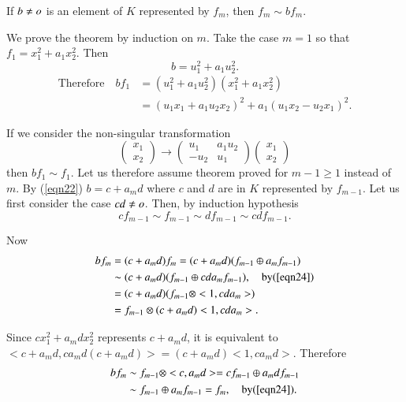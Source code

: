 \begin{thm}\label{thm6}
If $b\neq o$ is an element of $K$ represented by $f_m$, then
$f_m\sim bf_m$.
\end{thm}

\begin{Proof}
We prove the theorem by induction on $m$. Take the case $m=1$ so that
$f_1=x^{2}_1+a_1x^{2}_2$. Then
$$
b=u^{2}_1+a_1u^{2}_2.
$$
\begin{align*}
\text{Therefore}\quad bf_1&=
\left(u^{2}_1+a_1u^{2}_2\right)\left(x^{2}_1+a_1x^{2}_2\right)\\
&=(u_1x_1+a_1u_2x_2)^{2}+a_1(u_1x_2-u_2x_1)^{2}.
\end{align*}

If we consider the non-singular transformation
$$
\begin{pmatrix}
x_1\\
x_2
\end{pmatrix}\longrightarrow \begin{pmatrix}
u_1 & a_1u_2\\
-u_2 & u_1
\end{pmatrix}\begin{pmatrix}
x_1\\
x_2
\end{pmatrix}
$$
then $bf_1\sim f_1$. Let us therefore assume theorem proved for
$m-1\geq1$ instead of $m$. By (\ref{eqn22}) $b=c+a_md$ where $c$ and
$d$ are in $K$  represented by $f_{m-1}$. Let us first consider the
case $cd\neq o$. Then, by induction hypothesis
\begin{equation}\label{eqn24}
cf_{m-1}\sim f_{m-1}\sim df_{m-1}\sim cd f_{m-1}.
\end{equation}

Now
\begin{align*}
bf_{m}&=(c+a_{m}d)f_m=(c+a_md)(f_{m-1}\oplus a_mf_{m-1})\\
&\sim(c+a_md)(f_{m-1}\oplus cd a_mf_{m-1}), \quad \text{by}
(\ref{eqn24})\\
&= (c+a_md)(f_{m-1}\otimes <1, cd a_m>)\\
&=f_{m-1}\otimes (c+a_md)<1, cd a_m>.
\end{align*}

Since $cx^{2}_1+a_mdx_2^{2}$ represents $c+a_md$, it is equivalent to
$<c+a_md, ca_md(c+a_md)>=(c+a_md)<1, ca_md>$. Therefore 
\begin{align*}
bf_m&\sim f_{m-1}\otimes <c, a_md>=cf_{m-1}\oplus a_mdf_{m-1}\\
&\sim f_{m-1}\oplus a_m f_{m-1}=f_m, \quad \text{by} (\ref{eqn24}).
\end{align*}


\end{Proof}
